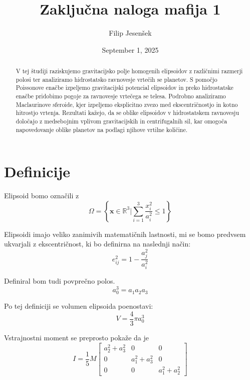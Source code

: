 \documentclass{article}
\title{Zaključna naloga mafija 1}
\author{Filip Jesenšek}
\date{September 1, 2025}
\theoremstyle{definition}
\theoremstyle{plain}
\numberwithin{definition}{section}
\numberwithin{theorem}{section}
\begin{document}
\maketitle

\newpage

\tableofcontents

\newpage


\begin{abstract}
V tej študiji raziskujemo gravitacijsko polje homogenih elipsoidov z različnimi razmerji polosi ter analiziramo hidrostatsko ravnovesje vrtečih se planetov. S pomočjo Poissonove enačbe izpeljemo gravitacijski potencial elipsoidov in preko hidrostatske enačbe pridobimo pogoje za ravnovesje vrtečega se telesa. Podrobno analiziramo Maclaurinove sferoide, kjer izpeljemo eksplicitno zvezo med ekscentričnostjo in kotno hitrostjo vrtenja. Rezultati kažejo, da se oblike elipsoidov v hidrostatskem ravnovesju določajo z medsebojnim vplivom gravitacijskih in centrifugalnih sil, kar omogoča napovedovanje oblike planetov na podlagi njihove vrtilne količine.	
\end{abstract}

\section{Definicije}
Elipsoid bomo označili z 
\begin{equation}
	\Omega = \left\{ \boldsymbol{x} \in \mathbb{R}^3 | 
	\sum_{i=1}^{3} \frac{x_i^2}{a_i^2} \leq 1 \right\}
	\label{eq: elipsoid}
\end{equation}

Elipsoidi imajo veliko zanimivih matematičnih lastnosti, mi se bomo predvsem
ukvarjali z ekscentričnost, ki bo definirna na naslednji način:
\begin{equation}
	e_{ij}^2 = 1 - \frac{a_j^2}{a_i^2}
	\label{eq:ekscentricnost}
\end{equation}

Definiral bom tudi povprečno polos.
\begin{equation}
	a_0^3 = a_1 a_2 a_3
	\label{eq:avg_polos}
\end{equation}

Po tej definiciji se volumen elipsoida poenostavi:
\begin{equation}
	V = \frac{4}{3} \pi a_0^3
	\label{eq:volumen_avg}
\end{equation}

Vstrajnostni moment se preprosto pokaže da je
\begin{equation}
	I = \frac{1}{5} M
	\begin{bmatrix}
		a_2^2 + a_3^2 & 0 & 0 \\
		0 & a_1^2 + a_3^2 & 0 \\
		0 & 0 & a_1^2 + a_2^2
	\end{bmatrix}
	\label{eq:vstrajnostni}
\end{equation}
\end{document}
